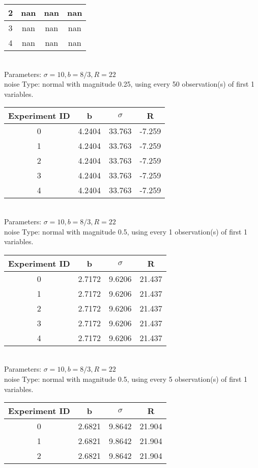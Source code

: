 \begin{multicols}{3}
\begin{tabular}{cccc}
 2 & nan & nan & nan\\ \hline 
 3 & nan & nan & nan\\ \hline 
 4 & nan & nan & nan\\ \hline 
 \end{tabular}\\
Parameters: $\sigma=10, b=8/3, R=22$\\
noise Type: normal with magnitude 0.25, using every 50 observation(s) of first 1 variables.\\
\begin{tabular}{cccc}
\hline Experiment ID & b & $\sigma$ & R \\ \hline 
0 & 4.2404 & 33.763 & -7.259\\ \hline 
 1 & 4.2404 & 33.763 & -7.259\\ \hline 
 2 & 4.2404 & 33.763 & -7.259\\ \hline 
 3 & 4.2404 & 33.763 & -7.259\\ \hline 
 4 & 4.2404 & 33.763 & -7.259\\ \hline 
 \end{tabular}\\
Parameters: $\sigma=10, b=8/3, R=22$\\
noise Type: normal with magnitude 0.5, using every 1 observation(s) of first 1 variables.\\
\begin{tabular}{cccc}
\hline Experiment ID & b & $\sigma$ & R \\ \hline 
0 & 2.7172 & 9.6206 & 21.437\\ \hline 
 1 & 2.7172 & 9.6206 & 21.437\\ \hline 
 2 & 2.7172 & 9.6206 & 21.437\\ \hline 
 3 & 2.7172 & 9.6206 & 21.437\\ \hline 
 4 & 2.7172 & 9.6206 & 21.437\\ \hline 
 \end{tabular}\\
Parameters: $\sigma=10, b=8/3, R=22$\\
noise Type: normal with magnitude 0.5, using every 5 observation(s) of first 1 variables.\\
\begin{tabular}{cccc}
\hline Experiment ID & b & $\sigma$ & R \\ \hline 
0 & 2.6821 & 9.8642 & 21.904\\ \hline 
 1 & 2.6821 & 9.8642 & 21.904\\ \hline 
 2 & 2.6821 & 9.8642 & 21.904\\ \hline 

\end{tabular}
\end{multicols}
